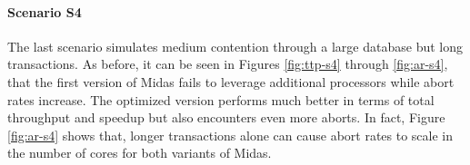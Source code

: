 

\paragraph{Scenario S4}

The last scenario simulates medium contention through a large database but long
transactions. As before, it can be seen in Figures \ref{fig:ttp-s4} through
\ref{fig:ar-s4}, that the first version of Midas fails to leverage additional
processors while abort rates increase. The optimized version performs much
better in terms of total throughput and speedup but also encounters even more
aborts. In fact, Figure \ref{fig:ar-s4} shows that, longer transactions alone
can cause abort rates to scale in the number of cores for both variants of
Midas.

